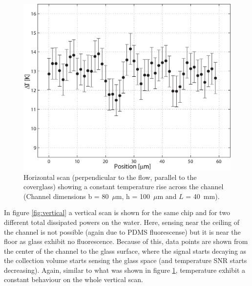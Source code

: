 \documentclass[9pt,twocolumn,twoside]{osajnl}
\begin{document}
\begin{figure}[htbp]
\centering
\includegraphics[width=\columnwidth]{figs/fig5.eps}
\caption{Horizontal scan (perpendicular to the flow, parallel to the coverglass) showing a constant temperature rise across the channel (Channel dimensions  b = 80~$\mu\mathrm{m}$, h = 100~$\mu\mathrm{m}$ and $L$ = 40~mm).\label{fig:horizontal}}
\end{figure}

In figure \ref{fig:vertical} a vertical scan is shown for the same chip and for two different total dissipated powers on the water. Here, sensing near the ceiling of the channel is not possible (again due to PDMS fluorescense) but it is near the floor as glass exhibit no fluorescence. Because of this, data points are shown from the center of the channel to the glass surface, where the signal starts decaying as the collection volume starts sensing the glass space (and temperature SNR starts decreasing). Again, similar to what was shown in figure \ref{fig:horizontal}, temperature exhibit a constant behaviour on the whole vertical scan.
\end{document}
